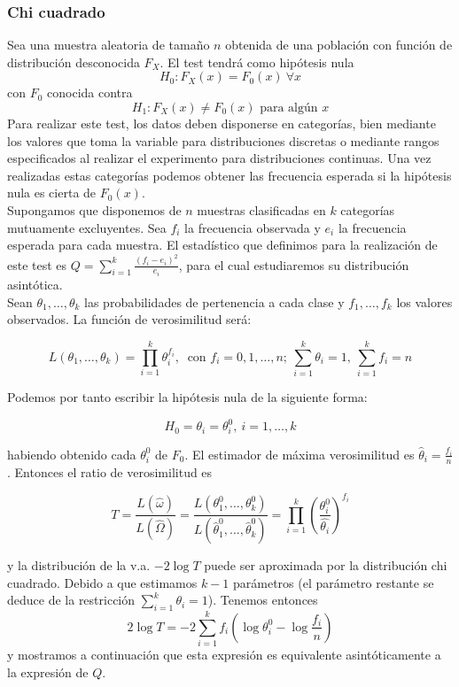 \subsubsection{Chi cuadrado}

	Sea una muestra aleatoria de tamaño $n$ obtenida de una población con función de distribución desconocida $F_X$. El test tendrá como hipótesis nula
		\[ H_0: F_X(x) = F_0(x) \ \forall x \]
	con $F_0$ conocida contra
		\[ H_1: F_X(x) \neq F_0(x) \text{ para algún }  x \]
	Para realizar este test, los datos deben disponerse en categorías, bien mediante los valores que toma la variable para distribuciones discretas o mediante rangos especificados al realizar el experimento para distribuciones continuas. Una vez realizadas estas categorías podemos obtener las frecuencia esperada si la hipótesis nula es cierta de $F_0(x)$.\\
	
	Supongamos que disponemos de $n$ muestras clasificadas en $k$ categorías mutuamente excluyentes. Sea $f_i$ la frecuencia observada y $e_i$ la frecuencia esperada para cada muestra. El estadístico que definimos para la realización de este test es $Q = \sum\limits_{i=1}^k \frac{(f_i-e_i)^2}{e_i}$, para el cual estudiaremos su distribución asintótica.\\
	
	Sean $\theta_1, \dots, \theta_k$ las probabilidades de pertenencia a cada clase y $f_1, \dots, f_k$ los valores observados. La función de verosimilitud será:
	
	\[ L(\theta_1, \dots, \theta_k) = 
			\prod\limits_{i=1}^k \theta_i^{f_i},\			
	   \text{ con } f_i = 0, 1, \dots, n; \
	   \sum\limits_{i=1}^k \theta_i = 1, \
	   \sum\limits_{i=1}^k f_i = n
	 \]
	 
	 Podemos por tanto escribir la hipótesis nula de la siguiente forma:
	 
	 \[ H_0 = \theta_i = \theta_i^0,\ i = 1, \dots, k \]
	 
	 habiendo obtenido cada $\theta_i^0$ de $F_0$. El estimador de máxima verosimilitud es $\hat{\theta}_i = \frac{f_i}{n}$. Entonces el ratio de verosimilitud es
	 
	 \[ 
	 T = \frac{L(\hat{\omega})}{L(\hat{\Omega})}
	   = \frac{L(\theta_1^0, \dots, \theta_k^0)}
	   		{L(\hat{\theta}_1^0, \dots, \hat{\theta}_k^0)}
	   = \prod\limits_{i=1}^k
	   		\left( 
	 			\frac{\theta_i^0}{\hat{\theta_i}} 
	 		\right)^{f_i}
	 \]
	 
	 y la distribución de la v.a. $-2 \log T$ puede ser aproximada por la distribución chi cuadrado. Debido a que estimamos $k-1$ parámetros (el parámetro restante se deduce de la restricción $\sum\limits_{i=1}^k \theta_i = 1$). Tenemos entonces
	 \begin{equation}
	 2 \log T = 
	 		-2 \sum\limits_{i=1}^k
	 			f_i \left(
	 					\log \theta_i^0 - \log \frac{f_i}{n}
	 				\right)
	 \label{2logT}
	 \end{equation}
	y mostramos a continuación que esta expresión es equivalente asintóticamente a la expresión de $Q$.\\
	
